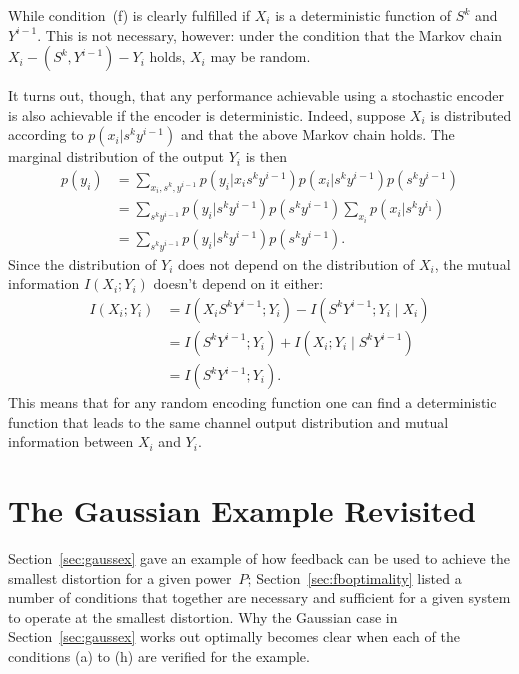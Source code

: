 \begin{remark}
  While condition~(f) is clearly fulfilled if $X_i$ is a
  deterministic function of $S^k$ and $Y^{i-1}$. This is not necessary, however:
  under the condition that the Markov chain $X_i - (S^k,Y^{i-1}) - Y_i$ holds,
  $X_i$ may be random.

  It turns out, though, that any performance achievable using a stochastic
  encoder is also achievable if the encoder is deterministic. Indeed, suppose
  $X_i$ is distributed according to $p(x_i | s^k y^{i-1})$ and that the above
  Markov chain holds. The marginal distribution of the output $Y_i$ is then
  \begin{align*}
    p(y_i) &= \sum_{x_i, s^k, y^{i-1}} p(y_i | x_i s^k y^{i-1}) p(x_i | s^k
    y^{i-1}) p(s^k y^{i-1}) \\
    &= \sum_{s^k y^{i-1}} p(y_i | s^k y^{i-1}) p(s^k y^{i-1}) \sum_{x_i} p(x_i |
    s^k y^{i_1}) \\
    &= \sum_{s^k y^{i-1}} p(y_i | s^k y^{i-1}) p(s^k y^{i-1}).
  \end{align*}
  Since the distribution of $Y_i$ does not depend on the distribution of $X_i$,
  the mutual information $I(X_i; Y_i)$ doesn't depend on it either:
  \begin{align*}
    I(X_i; Y_i) &= I(X_i S^k Y^{i-1}; Y_i) - I(S^k Y^{i-1}; Y_i \mid X_i) \\
    &= I(S^k Y^{i-1}; Y_i) + I(X_i; Y_i \mid S^k Y^{i-1}) \\
    &= I(S^k Y^{i-1}; Y_i).
  \end{align*}
  This means that for any random encoding function one can find a deterministic
  function that leads to the same channel output distribution and mutual
  information between $X_i$ and $Y_i$.
\end{remark}


\section{The Gaussian Example Revisited}
\label{sec:gaussexrev}

Section~\ref{sec:gaussex} gave an example of how feedback can be used to achieve
the smallest distortion for a given power~$P$; Section~\ref{sec:fboptimality}
listed a number of conditions that together are necessary and sufficient for a
given system to operate at the smallest distortion. Why the Gaussian case in
Section~\ref{sec:gaussex} works out optimally becomes clear when each of the
conditions (a) to (h) are verified for the example.

